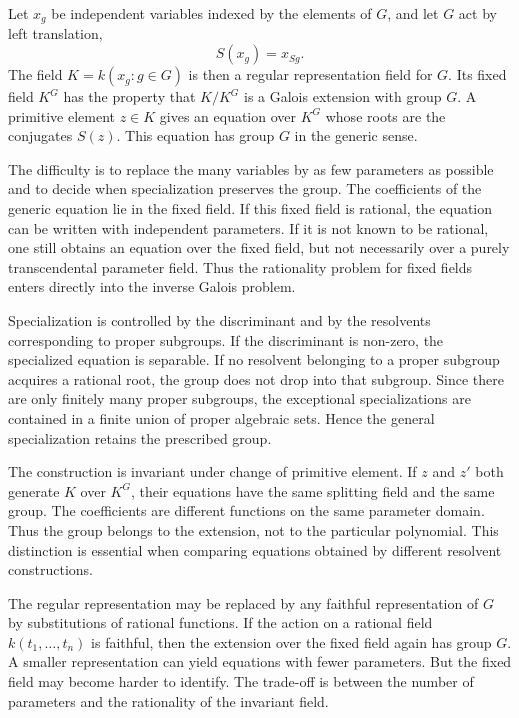 \documentclass[12pt]{article}
\begin{document}
Let \(x_g\) be independent variables indexed by the elements of \(G\), and let \(G\) act by left
translation, \[   S(x_g)=x_{Sg}. \] The field \(K=k(x_g:g\in G)\) is then a regular representation
field for \(G\). Its fixed field \(K^G\) has the property that \(K/K^G\) is a Galois extension with
group \(G\). A primitive element \(z\in K\) gives an equation over \(K^G\) whose roots are the
conjugates \(S(z)\). This equation has group \(G\) in the generic sense.


The difficulty is to replace the many variables by as few parameters as possible and to decide when
specialization preserves the group. The coefficients of the generic equation lie in the fixed field.
If this fixed field is rational, the equation can be written with independent parameters. If it is
not known to be rational, one still obtains an equation over the fixed field, but not necessarily
over a purely transcendental parameter field. Thus the rationality problem for fixed fields enters
directly into the inverse Galois problem.


Specialization is controlled by the discriminant and by the resolvents corresponding to proper
subgroups. If the discriminant is non-zero, the specialized equation is separable. If no resolvent
belonging to a proper subgroup acquires a rational root, the group does not drop into that subgroup.
Since there are only finitely many proper subgroups, the exceptional specializations are contained
in a finite union of proper algebraic sets. Hence the general specialization retains the prescribed
group.


The construction is invariant under change of primitive element. If \(z\) and \(z'\) both generate
\(K\) over \(K^G\), their equations have the same splitting field and the same group. The
coefficients are different functions on the same parameter domain. Thus the group belongs to the
extension, not to the particular polynomial. This distinction is essential when comparing equations
obtained by different resolvent constructions.


The regular representation may be replaced by any faithful representation of \(G\) by substitutions
of rational functions. If the action on a rational field \(k(t_1, \ldots,t_n)\) is faithful, then
the extension over the fixed field again has group \(G\). A smaller representation can yield
equations with fewer parameters. But the fixed field may become harder to identify. The trade-off is
between the number of parameters and the rationality of the invariant field.
\end{document}
